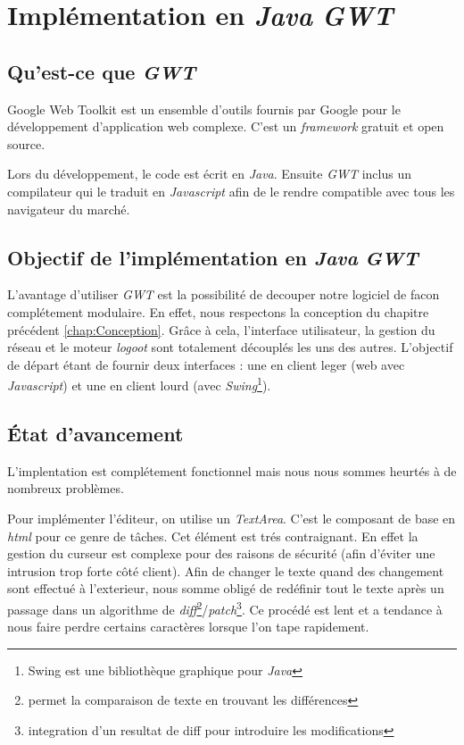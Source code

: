 \section{Implémentation en \emph{Java} \emph{GWT}}
  \subsection{Qu'est-ce que \emph{GWT}}
  Google Web Toolkit est un ensemble d'outils fournis par Google pour le
   développement d'application web complexe. C'est un \emph{framework} gratuit
   et open source.
   
   Lors du développement, le code est écrit en  \emph{Java}. Ensuite \emph{GWT} 
   inclus un compilateur qui le traduit en \emph{Javascript} afin de le rendre 
   compatible avec tous les navigateur du marché.
   
  \subsection{Objectif de l'implémentation en \emph{Java} \emph{GWT}}
  L'avantage d'utiliser \emph{GWT} est la possibilité de decouper notre 
  logiciel de facon complétement modulaire. En effet, nous respectons la
  conception du chapitre précédent \ref{chap:Conception}. Grâce à cela, 
  l'interface utilisateur, la gestion du réseau et le moteur \emph{logoot}
  sont totalement découplés les uns des autres. L'objectif de départ étant
  de fournir deux interfaces : une en client leger (web avec \emph{Javascript})
  et une en client lourd (avec \emph{Swing}\footnote{Swing est une bibliothèque
  graphique pour \emph{Java}}). 
  
  \subsection{État d'avancement}
	L'implentation est complétement fonctionnel mais nous nous sommes heurtés
	à de nombreux problèmes.
	
	\label{sec:textarea}
	Pour implémenter l'éditeur, on utilise un \emph{TextArea}. C'est le 
	composant de base en \emph{html} pour ce genre de tâches. Cet élément 
	est trés contraignant. En effet la gestion du curseur est complexe
	pour des raisons de sécurité (afin d'éviter une intrusion trop forte côté 
	client). Afin de changer le texte quand des changement sont effectué à 
	l'exterieur, nous somme obligé de redéfinir tout le texte après un 
	passage dans un algorithme de \emph{diff}\footnote{permet la comparaison 
	de texte en trouvant les différences}/\emph{patch}\footnote{integration
	d'un resultat de diff pour introduire les modifications}. Ce procédé
	est lent et a tendance à nous faire perdre certains caractères lorsque
	l'on tape rapidement.
	
